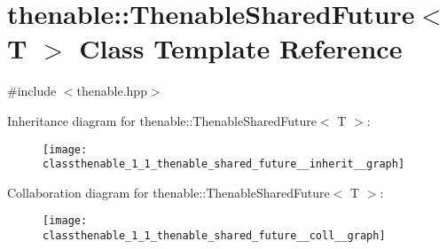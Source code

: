 \hypertarget{classthenable_1_1_thenable_shared_future}{}\section{thenable\+:\+:Thenable\+Shared\+Future$<$ T $>$ Class Template Reference}
\label{classthenable_1_1_thenable_shared_future}


{\ttfamily \#include $<$thenable.\+hpp$>$}



Inheritance diagram for thenable\+:\+:Thenable\+Shared\+Future$<$ T $>$\+:\nopagebreak
\begin{figure}[H]
\begin{center}
\leavevmode
\texttt{[image: classthenable\_1\_1\_thenable\_shared\_future\_\_inherit\_\_graph]}
\end{center}
\end{figure}


Collaboration diagram for thenable\+:\+:Thenable\+Shared\+Future$<$ T $>$\+:\nopagebreak
\begin{figure}[H]
\begin{center}
\leavevmode
\texttt{[image: classthenable\_1\_1\_thenable\_shared\_future\_\_coll\_\_graph]}
\end{center}
\end{figure}
